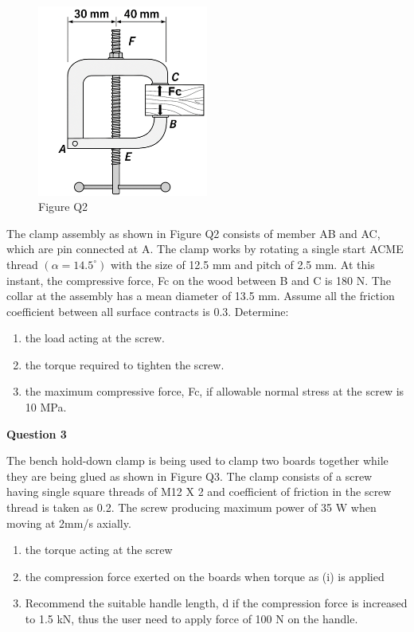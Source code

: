 \documentclass[a4paper, fleqn]{article}
\begin{document}
\begin{figure}[h]
    \centering
    \includegraphics[width=0.5\textwidth]{t2-q2.png}
    \caption{Figure Q2}
\end{figure}

The clamp assembly as shown in Figure Q2 consists of member AB and AC, which are pin connected at A. The clamp works by rotating a single start ACME thread $(\alpha=14.5^{\circ})$ with the size of 12.5 mm and pitch of 2.5 mm. At this instant, the compressive force, Fc on the wood between B and C is 180 N. The collar at the assembly has a mean diameter of 13.5 mm. Assume all the friction coefficient between all surface contracts is 0.3. Determine:

\begin{enumerate}[label=(\roman*)]
    \item the load acting at the screw.

    \item the torque required to tighten the screw.

    \item the maximum compressive force, Fc, if allowable normal stress at the screw is 10 MPa.
\end{enumerate}


\newpage

\textbf{Question 3}

The bench hold-down clamp is being used to clamp two boards together while they are being glued as shown in Figure Q3. The clamp consists of a screw having single square threads of M12 X 2 and coefficient of friction in the screw thread is taken as 0.2. The screw producing maximum power of 35 W when moving at 2mm/s axially.

\begin{enumerate}[label=(\roman*)]
    \item the torque acting at the screw

    \item the compression force exerted on the boards when torque as (i) is applied

    \item Recommend the suitable handle length, d if the compression force is increased to 1.5 kN, thus the user need to apply force of 100 N on the handle.
\end{enumerate}
\end{document}
